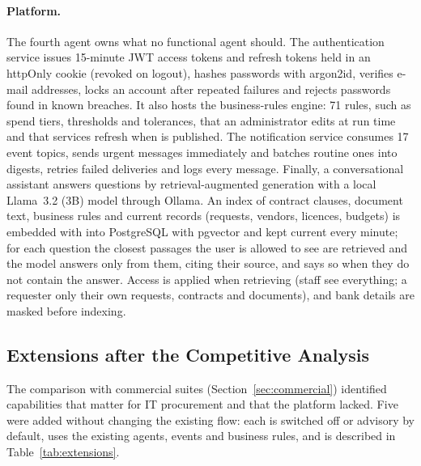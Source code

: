\paragraph{Platform.} The fourth agent owns what no functional agent should. The authentication service issues 15-minute JWT access tokens and refresh tokens held in an httpOnly cookie (revoked on logout), hashes passwords with argon2id, verifies e-mail addresses, locks an account after repeated failures and rejects passwords found in known breaches. It also hosts the business-rules engine: 71 rules, such as spend tiers, thresholds and tolerances, that an administrator edits at run time and that services refresh when  is published. The notification service consumes 17 event topics, sends urgent messages immediately and batches routine ones into digests, retries failed deliveries and logs every message. Finally, a conversational assistant answers questions by retrieval-augmented generation with a local Llama~3.2 (3B) model through Ollama. An index of contract clauses, document text, business rules and current records (requests, vendors, licences, budgets) is embedded with  into PostgreSQL with pgvector and kept current every minute; for each question the closest passages the user is allowed to see are retrieved and the model answers only from them, citing their source, and says so when they do not contain the answer. Access is applied when retrieving (staff see everything; a requester only their own requests, contracts and documents), and bank details are masked before indexing.

\subsection{Extensions after the Competitive Analysis}\label{sec:extensions}
The comparison with commercial suites (Section~\ref{sec:commercial}) identified capabilities that matter for IT procurement and that the platform lacked. Five were added without changing the existing flow: each is switched off or advisory by default, uses the existing agents, events and business rules, and is described in Table~\ref{tab:extensions}.

